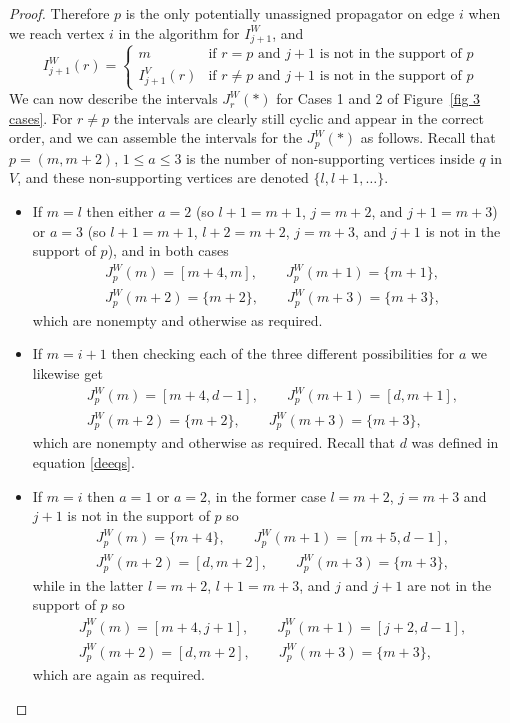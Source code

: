\documentclass[11pt]{article}
\theoremstyle{remark}
\theoremstyle{definition}
\begin{document}
\begin{proof}
Therefore $p$ is the only potentially unassigned propagator on edge $i$ when we reach vertex $i$ in the algorithm for $I_{j+1}^W$, and
    \[
    I_{j+1}^{W}(r)  = \begin{cases}
      m & \text{if  $r=p$ and $j+1$ is not in the support of $p$}\\
      I_{j+1}^{V}(r) & \text{if  $r\neq p$ and $j+1$ is not in the support of $p$}
    \end{cases}
    \]
We can now describe the intervals $J^{W}_r(*)$ for Cases 1 and 2 of Figure~\ref{fig 3 cases}. For $r \neq p$ the intervals are clearly still cyclic and appear in the correct order, and we can assemble the intervals for the $J_p^{W}(*)$ as follows. Recall that $p = (m,m+2)$, $1 \leq a \leq 3$ is the number of non-supporting vertices inside $q$ in $V$, and these non-supporting vertices are denoted $\{l,l+1, \dots\}$. 
    \begin{itemize}
      \item 
    If $m=l$ then either $a=2$ (so $l+1=m+1$, $j=m+2$, and $j+1=m+3$) or $a=3$ (so $l+1=m+1$, $l+2=m+2$, $j=m+3$, and $j+1$ is not in the support of $p$), and in both cases
    \begin{gather*}
    J^{W}_p(m) = [m+4, m], \qquad  J^{W}_p(m+1) = \{m+1\}, \\ J^{W}_p(m+2) = \{m+2\}, \qquad  J^{W}_p(m+3) = \{m+3\},
    \end{gather*}
    which are nonempty and otherwise as required.
  \item
        If $m=i+1$ then checking each of the three different possibilities for $a$ we likewise get
    \begin{gather*}
    J^{W}_p(m) = [m+4, d-1], \qquad  J^{W}_p(m+1) = [d, m+1], \\  J^{W}_p(m+2) = \{m+2\}, \qquad  J^{W}_p(m+3) = \{m+3\},
    \end{gather*}
    which are nonempty and otherwise as required. Recall that $d$ was defined in equation \eqref{deeqs}.
  \item If $m=i$ then $a=1$ or $a=2$, in the former case $l=m+2$, $j=m+3$ and $j+1$ is not in the support of $p$ so
    \begin{gather*}
    J^{W}_p(m) = \{m+4\}, \qquad  J^{W}_p(m+1) = [m+5, d-1], \\  J^{W}_p(m+2) = [d, m+2], \qquad  J^{W}_p(m+3) = \{m+3\},
    \end{gather*}
    while in the latter $l=m+2$, $l+1=m+3$, and $j$ and $j+1$ are not in the support of $p$ so
    \begin{gather*}
    J^{W}_p(m) = [m+4, j+1], \qquad  J^{W}_p(m+1) = [j+2, d-1], \\  J^{W}_p(m+2) = [d, m+2], \qquad  J^{W}_p(m+3) = \{m+3\},
    \end{gather*}
    which are again as required.
    \end{itemize}


\end{proof}
\end{document}
